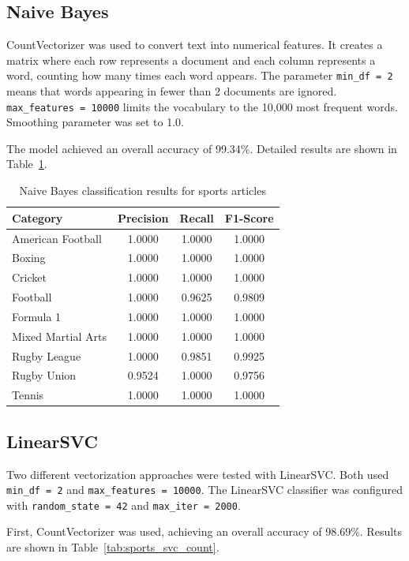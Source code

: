 \documentclass[12pt,a4paper]{article}
\begin{document}
\subsection{Naive Bayes}

CountVectorizer was used to convert text into numerical features. It creates a matrix where each row represents a document and each column represents a word, counting how many times each word appears. The parameter \texttt{min\_df = 2} means that words appearing in fewer than 2 documents are ignored. \texttt{max\_features = 10000} limits the vocabulary to the 10,000 most frequent words. Smoothing parameter was set to 1.0.

The model achieved an overall accuracy of 99.34\%. Detailed results are shown in Table~\ref{tab:sports_nb}.

\begin{table}[h]
\centering
\begin{tabular}{lccc}
\toprule
Category & Precision & Recall & F1-Score \\
\midrule
American Football & 1.0000 & 1.0000 & 1.0000 \\
Boxing & 1.0000 & 1.0000 & 1.0000 \\
Cricket & 1.0000 & 1.0000 & 1.0000 \\
Football & 1.0000 & 0.9625 & 0.9809 \\
Formula 1 & 1.0000 & 1.0000 & 1.0000 \\
Mixed Martial Arts & 1.0000 & 1.0000 & 1.0000 \\
Rugby League & 1.0000 & 0.9851 & 0.9925 \\
Rugby Union & 0.9524 & 1.0000 & 0.9756 \\
Tennis & 1.0000 & 1.0000 & 1.0000 \\
\bottomrule
\end{tabular}
\caption{Naive Bayes classification results for sports articles}
\label{tab:sports_nb}
\end{table}

\subsection{LinearSVC}

Two different vectorization approaches were tested with LinearSVC. Both used \texttt{min\_df = 2} and \texttt{max\_features = 10000}. The LinearSVC classifier was configured with \texttt{random\_state = 42} and \texttt{max\_iter = 2000}.

First, CountVectorizer was used, achieving an overall accuracy of 98.69\%. Results are shown in Table~\ref{tab:sports_svc_count}.
\end{document}
